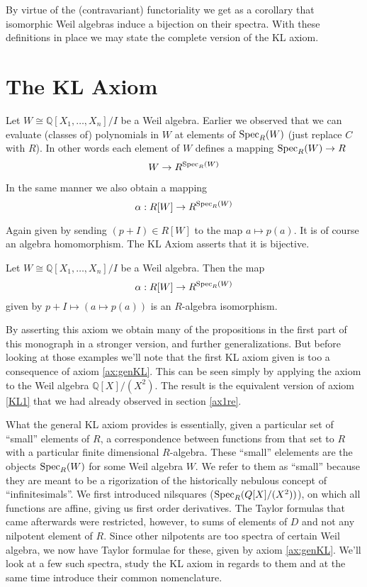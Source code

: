 By virtue of the (contravariant) functoriality we get as a corollary that isomorphic Weil algebras induce a bijection on their spectra. With these definitions in place we may state the complete version of the KL axiom.

\section{The KL Axiom}

Let \( W\cong \mathbb{Q}[X_1,\dots,X_n]/I \) be a Weil algebra. Earlier we observed that we can evaluate (classes of) polynomials in \( W \) at elements of \( \operatorname{Spec}_R(W) \) (just replace \( C \) with \( R \)). In other words each element of \( W \) defines a mapping \( \operatorname{Spec}_R(W)\to R \)
\begin{equation*}
  W\to R^{\operatorname{Spec}_R(W)}
\end{equation*}

In the same manner we also obtain a mapping
\begin{equation*}
  \alpha : R[W]\to R^{\operatorname{Spec}_R(W)}
\end{equation*}

Again given by sending \( (p+I)\in R[W] \) to the map \( a\mapsto p(a) \). It is of course an algebra homomorphism. The KL Axiom asserts that it is bijective.
\begin{axiom}[KL]
  Let \( W\cong \mathbb{Q}[X_1,\dots,X_n]/I \) be a Weil algebra. Then the map
  \begin{equation*}
    \alpha : R[W]\to R^{\operatorname{Spec}_R(W)}
  \end{equation*}
  given by \( p+I \mapsto (a\mapsto p(a)) \) is an \( R \)-algebra isomorphism.
  \label{ax:genKL}
\end{axiom}

By asserting this axiom we obtain many of the propositions in the first part of this monograph in a stronger version, and further generalizations. But before looking at those examples we'll note that the first KL axiom given is too a consequence of axiom \ref{ax:genKL}. This can be seen simply by applying the axiom to the Weil algebra \( \mathbb{Q}[X]/(X^2) \). The result is the equivalent version of axiom \ref{KL1} that we had already observed in section \ref{ax1re}.

What the general KL axiom provides is essentially, given a particular set of ``small'' elements of \( R \), a correspondence between functions from that set to \( R \) with a particular finite dimensional \( R \)-algebra. These ``small'' elelements are the objects \( \operatorname{Spec}_R(W) \) for some Weil algebra \( W \).  We refer to them as ``small'' because they are meant to be a rigorization of the historically nebulous concept of ``infinitesimals''. We first introduced nilsquares (\( \operatorname{Spec}_R(Q[X]/(X^2)) \)), on which all functions are affine, giving us first order derivatives. The Taylor formulas that came afterwards were restricted, however, to sums of elements of \( D \) and not any nilpotent element of \( R \). Since other nilpotents are too spectra of certain Weil algebra, we now have Taylor formulae for these, given by axiom \ref{ax:genKL}. We'll look at a few such spectra, study the KL axiom in regards to them and at the same time introduce their common nomenclature.

